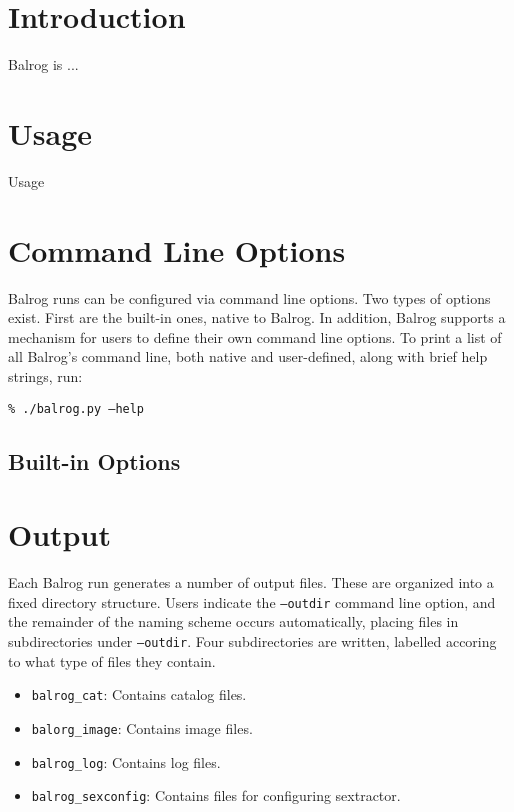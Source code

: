 \documentclass[12pt]{article}
\newcommand{\balrog}{Balrog}
\newcommand{\opt}[1]{\texttt{--#1}}
\newcommand{\bcmd}[1]{\texttt{\% ./balrog.py #1}}
\begin{document}
\balrogtitlepage

\newpage
\tableofcontents

\newpage
\section{Introduction}
\label{sec:intro}
\balrog{} is ...

\section{Usage}
Usage

\section{Command Line Options}
\balrog{} runs can be configured via command line options.
Two types of options exist. First are the built-in
ones, native to \balrog{}. In addition, \balrog{}
supports a mechanism for users to define their
own command line options.
To print a list of all \balrog{}'s command line,
both native and user-defined, along with
brief help strings, run:

\bcmd{\opt{help}}


\subsection{Built-in Options}

\optstab{}


\section{Output}
Each \balrog{} run generates a number of output files. 
These are organized into a fixed directory structure.
Users indicate the \opt{outdir} command line option, and
the remainder of the naming scheme occurs automatically,
placing files in subdirectories under \opt{outdir}.
Four subdirectories are written, labelled accoring to what
type of files they contain. 

\begin{itemize}
	\item \texttt{balrog\_cat}: Contains catalog files.
	\item \texttt{balorg\_image}: Contains image files.
	\item \texttt{balrog\_log}: Contains log files.
	\item \texttt{balrog\_sexconfig}: Contains files for configuring sextractor.
\end{itemize}
\end{document}
